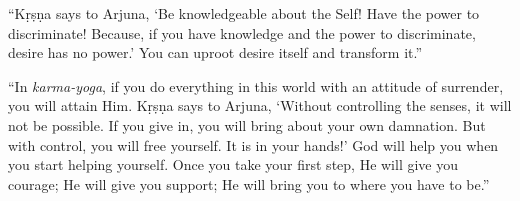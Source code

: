 \enquote{Kṛṣṇa says to Arjuna, \enquote{Be knowledgeable about the Self! Have the power to discriminate! Because, if you have knowledge and the power to discriminate, desire has no power.} You can uproot desire itself and transform it.}

\enquote{In \textit{karma-yoga}, if you do everything in this world with an attitude of surrender, you will attain Him. Kṛṣṇa says to Arjuna, \enquote{Without controlling the senses, it will not be possible. If you give in, you will bring about your own damnation. But with control, you will free yourself. It is in your hands!} God will help you when you start helping yourself. Once you take your first step, He will give you courage; He will give you support; He will bring you to where you have to be.}

